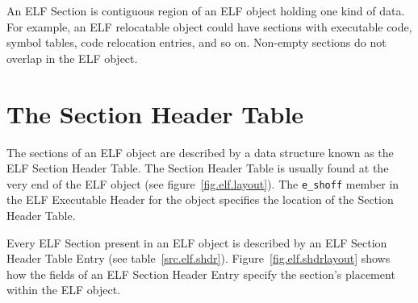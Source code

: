 \documentclass[a4paper,pdftex]{book}
\makeatletter
\newcommand{\parameter}[1]{\texttt{#1}\index{#1@\texttt{#1}}}
\newcommand{\elfdatastructure}[1]{\textsf{#1}}
\makeatother
\begin{document}
An ELF \elfdatastructure{Section} is contiguous region
of an ELF object holding one kind of data. For example, an ELF
relocatable object could have sections with executable code, symbol
tables, code relocation entries, and so on.
Non-empty sections do not overlap in the ELF object.

\section{The Section Header Table}

The sections of an ELF object are described by a data structure known
as the ELF \elfdatastructure{Section Header Table}.  The
\elfdatastructure{Section Header Table} is usually found at
the very end of the ELF object (see figure~\vref{fig.elf.layout}).
The \parameter{e\_shoff} member in the ELF
\elfdatastructure{Executable Header} for the object specifies the
location of the \elfdatastructure{Section Header Table}.

Every ELF \elfdatastructure{Section} present in an ELF object is
described by an ELF \elfdatastructure{Section Header Table Entry} (see
table~\vref{src.elf.shdr}). Figure~\vref{fig.elf.shdrlayout} shows how
the fields of an ELF \elfdatastructure{Section Header Entry} specify
the section's placement within the ELF
object.
\end{document}
